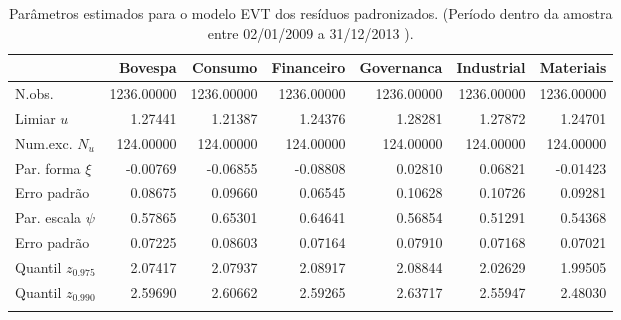 \begin{longtable}{lrrrrrr}
\caption{Parâmetros estimados para o modelo EVT dos resíduos padronizados. 
               (Período dentro da amostra entre 02/01/2009 a 31/12/2013 ).} \\ 
  \toprule
 & Bovespa & Consumo & Financeiro & Governanca & Industrial & Materiais \\ 
  \midrule
N.obs. & 1236.00000 & 1236.00000 & 1236.00000 & 1236.00000 & 1236.00000 & 1236.00000 \\ 
  Limiar $u$ & 1.27441 & 1.21387 & 1.24376 & 1.28281 & 1.27872 & 1.24701 \\ 
  Num.exc. $N_u$ & 124.00000 & 124.00000 & 124.00000 & 124.00000 & 124.00000 & 124.00000 \\ 
  Par. forma $\xi$ & -0.00769 & -0.06855 & -0.08808 & 0.02810 & 0.06821 & -0.01423 \\ 
  Erro padrão & 0.08675 & 0.09660 & 0.06545 & 0.10628 & 0.10726 & 0.09281 \\ 
  Par. escala $\psi$ & 0.57865 & 0.65301 & 0.64641 & 0.56854 & 0.51291 & 0.54368 \\ 
  Erro padrão & 0.07225 & 0.08603 & 0.07164 & 0.07910 & 0.07168 & 0.07021 \\ 
  Quantil $z_{0.975}$ & 2.07417 & 2.07937 & 2.08917 & 2.08844 & 2.02629 & 1.99505 \\ 
  Quantil $z_{0.990}$ & 2.59690 & 2.60662 & 2.59265 & 2.63717 & 2.55947 & 2.48030 \\ 
   \bottomrule
\label{tab:evtcoef}
\end{longtable}
